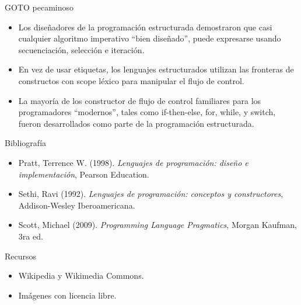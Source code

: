 \documentclass[handout]{beamer} %
\begin{document}
\begin{frame}{GOTO pecaminoso}
    \begin{itemize}
        \item<1-> Los diseñadores de la programación estructurada demostraron que casi cualquier algoritmo imperativo ``bien diseñado'', puede expresarse usando secuenciación, selección e iteración.
        \item<2-> En vez de usar etiquetas, los lenguajes estructurados utilizan las fronteras de constructos con scope léxico para manipular el flujo de control.
        \item<3-> La mayoría de los constructor de flujo de control familiares para los programadores ``modernos'', tales como if-then-else, for, while, y switch, fueron desarrollados como parte de la programación estructurada.
    \end{itemize}
\end{frame}


\begin{frame}
 \begin{block}{Bibliografía}
  \begin{itemize}
    \item Pratt, Terrence W. (1998). \textit{Lenguajes de programación: diseño e implementación}, Pearson Education.
    \item Sethi, Ravi (1992). \textit{Lenguajes de programación: conceptos y constructores}, Addison-Wesley Iberoamericana.
    \item Scott, Michael (2009). \textit{Programming Language Pragmatics}, Morgan Kaufman, 3ra ed.
  \end{itemize}
 \end{block}
 \begin{block}{Recursos}
  \begin{itemize}
    \item Wikipedia y Wikimedia Commons.
    \item Imágenes con licencia libre.
  \end{itemize}
 \end{block}
\end{frame}
\end{document}
